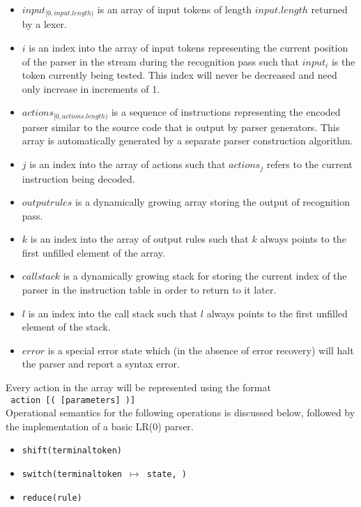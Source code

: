 \documentclass[11pt]{article}
\begin{document}
\begin{itemize}
\item $input_{[0, input.length)}$ is an array of input tokens of length $input.length$ returned by a lexer.
\item $i$ is an index into the array of input tokens representing the current position of the parser in the stream during the recognition pass such that $input_i$ is the token currently being tested.
This index will never be decreased and need only increase in increments of 1.
\item $actions_{[0, actions.length)}$ is a sequence of instructions representing the encoded parser similar to the source code that is output by parser generators. 
This array is automatically generated by a separate parser construction algorithm.
\item $j$ is an index into the array of actions such that $actions_j$ refers to the current instruction being decoded.
\item $outputrules$ is a dynamically growing array storing the output of recognition pass.
\item $k$ is an index into the array of output rules such that $k$ always points to the first unfilled element of the array.
\item $callstack$ is a dynamically growing stack for storing the current index of the parser in the instruction table in order to return to it later.
\item $l$ is an index into the call stack such that $l$ always points to the first unfilled element of the stack.
\item $error$ is a special error state which (in the absence of error recovery) will halt the parser and report a syntax error.
\end{itemize}

Every action in the array will be represented using the format\\ \texttt{ action [( [parameters\textellipsis] )]}\\

Operational semantics for the following operations is discussed below, followed by the implementation of a basic LR(0) parser.
\begin{itemize}
\item \texttt{shift(terminaltoken)}
\item \texttt{switch(terminaltoken $\mapsto$ state, \textellipsis)}
\item \texttt{reduce(rule)}
\end{itemize}
\end{document}
